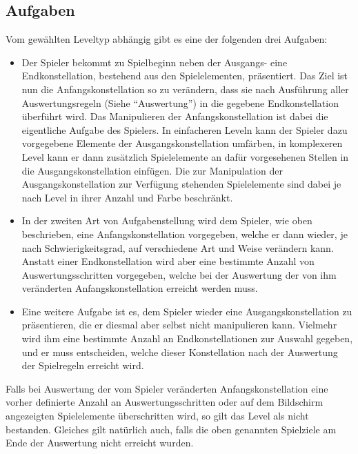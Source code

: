 \subsection{Aufgaben}
Vom gewählten Leveltyp abhängig gibt es eine der folgenden drei Aufgaben:
        \begin{itemize}
                \item Der Spieler bekommt zu Spielbeginn neben der Ausgangs- eine Endkonstellation, bestehend aus den Spielelementen, präsentiert.
                Das Ziel ist nun die Anfangskonstellation so zu verändern, dass sie nach Ausführung aller Auswertungsregeln (Siehe "`Auswertung"') in die gegebene Endkonstellation überführt wird.
                Das Manipulieren der Anfangskonstellation ist dabei die eigentliche Aufgabe des Spielers.
                In einfacheren Leveln kann der Spieler dazu vorgegebene Elemente der Ausgangskonstellation umfärben, in komplexeren Level kann er dann zusätzlich Spielelemente an dafür vorgesehenen Stellen in die Ausgangskonstellation einfügen. 
                Die zur Manipulation der Ausgangskonstellation zur Verfügung stehenden Spielelemente sind dabei je nach Level in ihrer Anzahl und Farbe beschränkt.

                \item In der zweiten Art von Aufgabenstellung wird dem Spieler, wie oben beschrieben, eine Anfangskonstellation vorgegeben, welche er dann wieder, je nach Schwierigkeitsgrad, auf verschiedene Art und Weise verändern kann.
                Anstatt einer Endkonstellation wird aber eine bestimmte Anzahl von Auswertungsschritten vorgegeben, welche bei der Auswertung der von ihm veränderten Anfangskonstellation erreicht werden muss.

                \item Eine weitere Aufgabe ist es, dem Spieler wieder eine Ausgangskonstellation zu präsentieren, die er diesmal aber selbst nicht manipulieren kann. 
                Vielmehr wird ihm eine bestimmte Anzahl an Endkonstellationen zur Auswahl gegeben, und er muss entscheiden, welche dieser Konstellation nach der Auswertung der Spielregeln erreicht wird.

        \end{itemize}

        Falls bei Auswertung der vom Spieler veränderten Anfangskonstellation eine vorher definierte Anzahl an Auswertungsschritten oder auf dem Bildschirm angezeigten Spielelemente überschritten wird, so gilt das Level als nicht bestanden. 
        Gleiches gilt natürlich auch, falls die oben genannten Spielziele am Ende der Auswertung nicht erreicht wurden.
        
